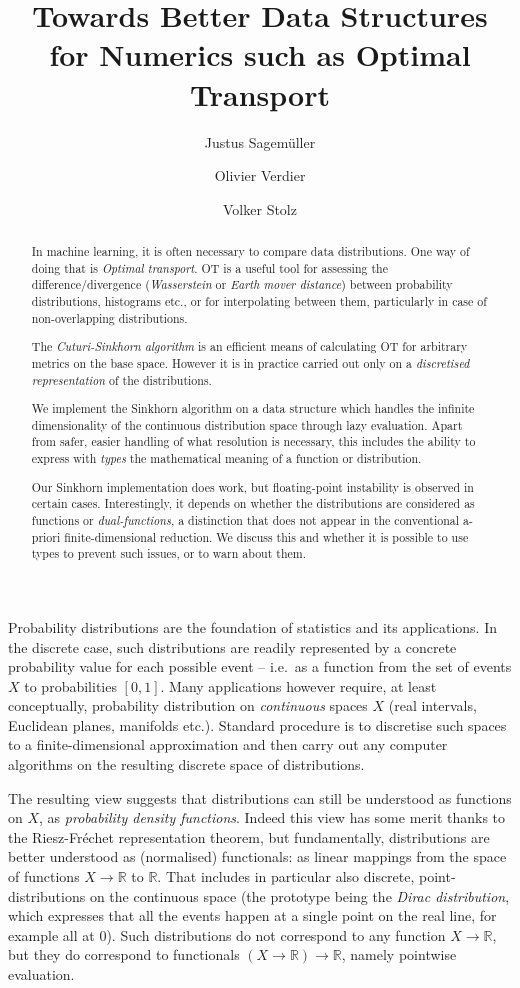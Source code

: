 \documentclass[a4paper]{easychair}
\title{Towards Better Data Structures for Numerics such as Optimal Transport}
\author{
   Justus Sagemüller\inst{1}
\and
    Olivier Verdier\inst{1}
\and
    Volker Stolz\inst{1}
}
\institute{
  Western Norway University of Applied Sciences, 
  Bergen, Norway\\
  \email{\{jsag,over,vsto\}@hvl.no}
 }
\begin{document}
\maketitle

\begin{abstract}
  In machine learning, it is often necessary to compare data distributions. One way of doing that is \emph{Optimal transport}. OT is a useful tool for assessing the difference/divergence (\emph{Wasserstein} or \emph{Earth mover distance}) between probability distributions, histograms etc., or for interpolating between them, particularly in case of non-overlapping distributions.
  
  The \emph{Cuturi-Sinkhorn algorithm} is an efficient means of calculating OT for arbitrary metrics on the base space. However it is in practice carried out only on a \emph{discretised representation} of the distributions.
  
  We implement the Sinkhorn algorithm on a data structure which handles the infinite dimensionality of the continuous distribution space through lazy evaluation. Apart from safer, easier handling of what resolution is necessary, this includes the ability to express with \emph{types} the mathematical meaning of a function or distribution.
  
  Our Sinkhorn implementation does work, but floating-point instability is observed in certain cases. Interestingly, it depends on whether the distributions are considered as functions or \emph{dual-functions}, a distinction that does not appear in the conventional a-priori finite-dimensional reduction. We discuss this and whether it is possible to use types to prevent such issues, or to warn about them.
\end{abstract}

\label{sec:introduction}
\noindent%
Probability distributions are the foundation of statistics and its applications. In the discrete case, such distributions are readily represented by a concrete probability value for each possible event -- i.e.\ as a function from the set of events $X$ to probabilities $[0,1]$.
Many applications however require, at least conceptually, probability distribution on \emph{continuous} spaces $X$ (real intervals, Euclidean planes, manifolds etc.).
Standard procedure is to discretise such spaces to a finite-dimensional approximation and then carry out any computer algorithms on the resulting discrete space of distributions. 

The resulting view suggests that distributions can still be understood as functions on $X$, as \emph{probability density functions}. Indeed this view has some merit thanks to the Riesz-Fréchet representation theorem, but fundamentally, distributions are better understood as (normalised) function{al}s: as linear mappings from the space of functions $X\to\mathbb{R}$ to $\mathbb{R}$.
That includes in particular also discrete, point-distributions on the continuous space (the prototype being the \emph{Dirac distribution}, which expresses that all the events happen at a single point on the real line, for example all at 0). Such distributions do not correspond to any function $X\to\mathbb{R}$, but they do correspond to functionals $(X\to\mathbb{R})\to\mathbb{R}$, namely pointwise evaluation.
\end{document}
